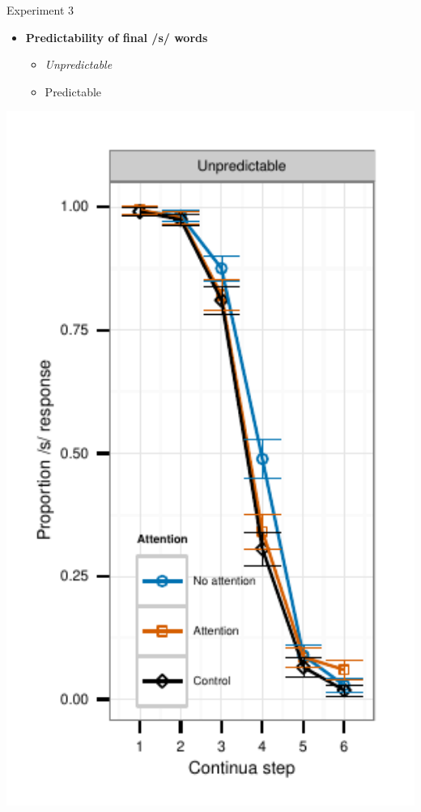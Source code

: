 \documentclass{beamer}
\begin{document}
\begin{frame}{Experiment 3}
\begin{minipage}{0.45\textwidth}
\begin{itemize}
\item \textbf{Predictability of final /s/ words}
\begin{itemize}
\item \emph{Unpredictable}
\item Predictable
\end{itemize}
\end{itemize}
\end{minipage}
\hfill
\begin{minipage}{0.4\textwidth}
\includegraphics[width=1.0\textwidth]{graphs/exp3_categresults_present2-unpredictable}
\end{minipage}

\end{frame}
\end{document}
